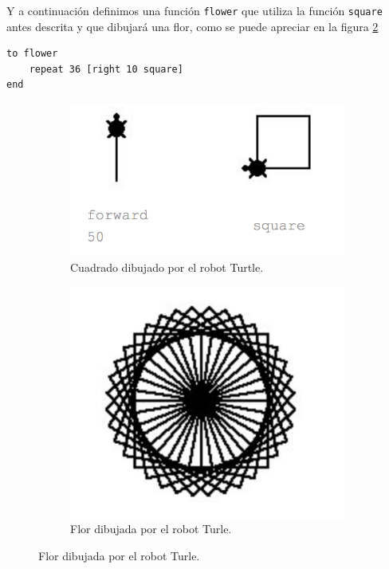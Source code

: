Y a continuación definimos una función \texttt{flower} que utiliza la función \texttt{square} antes descrita y que dibujará una flor, como se puede apreciar en la figura \ref{fig:flower-turtle}

\begin{lstlisting}
to flower
	repeat 36 [right 10 square]
end
\end{lstlisting}

\begin{figure}[!ht]
	\begin{adjustwidth}{\oddsidemargin-1in}{\rightmargin}
			\begin{subfigure}{\paperwidth}
				\centering
				\includegraphics[scale=.45]{images/square-turtle.png}
				\caption{Cuadrado dibujado por el robot Turtle.}
				\label{fig:square-turtle}
			\end{subfigure}
			\begin{subfigure}{\paperwidth}
				\centering
				\includegraphics[scale=.45]{images/flower-turtle.png}
				\caption{Flor dibujada por el robot Turle.}
				\label{fig:flower-turtle}
			\end{subfigure}
		\label{fig:square-flower-turtle}
	\end{adjustwidth}
\end{figure}


